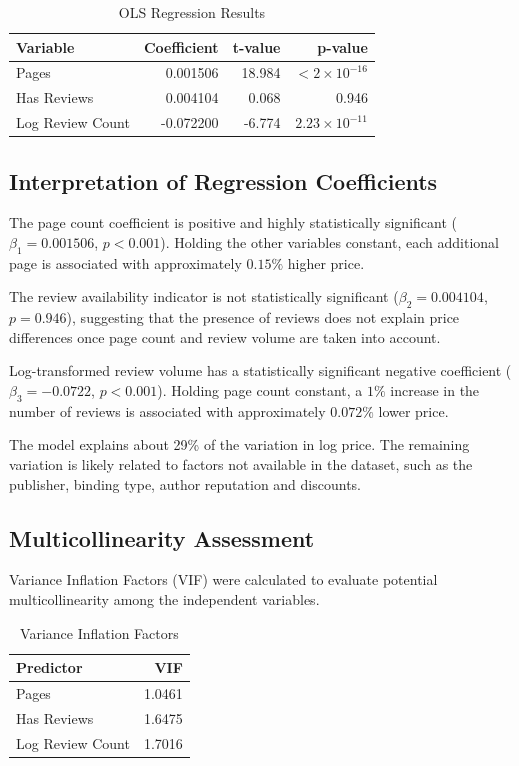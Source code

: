 \documentclass[11pt,a4paper]{article}
\begin{document}
\begin{table}[H]
\centering
\caption{OLS Regression Results}
\label{tab:ols_results}
\begin{tabular}{lrrr}
\toprule
Variable & Coefficient & t-value & p-value \\
\midrule
Pages & 0.001506 & 18.984 & $< 2 \times 10^{-16}$ \\
Has Reviews & 0.004104 & 0.068 & 0.946 \\
Log Review Count & -0.072200 & -6.774 & $2.23 \times 10^{-11}$ \\
\bottomrule
\end{tabular}
\end{table}

\subsection{Interpretation of Regression Coefficients}
The page count coefficient is positive and highly statistically significant ($\beta_1=0.001506$, $p<0.001$). Holding the other variables constant, each additional page is associated with approximately $0.15\%$ higher price.

The review availability indicator is not statistically significant ($\beta_2=0.004104$, $p=0.946$), suggesting that the presence of reviews does not explain price differences once page count and review volume are taken into account.

Log-transformed review volume has a statistically significant negative coefficient ($\beta_3=-0.0722$, $p<0.001$). Holding page count constant, a $1\%$ increase in the number of reviews is associated with approximately $0.072\%$ lower price.

The model explains about 29\% of the variation in log price. The remaining variation is likely related to factors not available in the dataset, such as the publisher, binding type, author reputation and discounts.
\newpage
\subsection{Multicollinearity Assessment}

Variance Inflation Factors (VIF) were calculated to evaluate potential multicollinearity among the independent variables.

\begin{table}[H]
\centering
\caption{Variance Inflation Factors}
\label{tab:vif_results}
\begin{tabular}{lr}
\toprule
Predictor & VIF \\
\midrule
Pages & 1.0461 \\
Has Reviews & 1.6475 \\
Log Review Count & 1.7016 \\
\bottomrule
\end{tabular}
\end{table}
\end{document}
